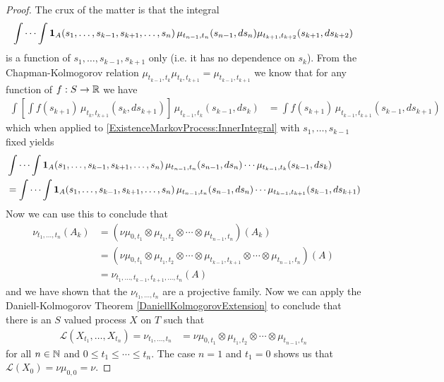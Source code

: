 \begin{proof}
The crux of the matter is that the integral
\begin{align}\label{ExistenceMarkovProcess:InnerIntegral}
\idotsint \textbf{1}_{A}(s_1, \dotsc, s_{k-1}, s_{k+1}, \dotsc, s_n) \, 
\mu_{t_{n-1},t_n}(s_{n-1}, ds_n) \mu_{t_{k+1}, t_{k+2}}(s_{k+1}, ds_{k+2}) 
\end{align}
is a function of $s_1, \dotsc, s_{k-1}, s_{k+1}$ only (i.e. it has no dependence on $s_k$).  From the Chapman-Kolmogorov relation
$\mu_{t_{k-1}, t_k} \mu_{t_{k}, t_{k+1}}  = \mu_{t_{k-1}, t_{k+1}}$ we
know that for any function of $f : S \to \mathbb{R}$ we have 
\begin{align*}
\int \left [
  \int
f(s_{k+1}) \, \mu_{t_{k}, t_{k+1}} (s_k, ds_{k+1}) \right ] \, \mu_{t_{k-1}, t_k}
(s_{k-1}, ds_{k}) &= \int
f(s_{k+1}) \, \mu_{t_{k-1}, t_{k+1}} (s_{k-1}, ds_{k+1}) 
\end{align*}
which when applied to \eqref{ExistenceMarkovProcess:InnerIntegral} with $s_1, \dotsc, s_{k-1}$ fixed yields
\begin{align*}
&\idotsint \textbf{1}_{A}(s_1,\dotsc, s_{k-1}, s_{k+1}, \dotsc, s_n) \,
\mu_{t_{n-1},t_n}(s_{n-1}, ds_n) \dotsb \mu_{t_{k-1},t_{k}}(s_{k-1}, ds_{k}) \\
&=\idotsint \textbf{1}_{A}(s_1,\dotsc, s_{k-1}, s_{k+1}, \dotsc, s_n) \,
\mu_{t_{n-1},t_n}(s_{n-1}, ds_n) \dotsb \mu_{t_{k-1}, t_{k+1}}(s_{k-1}, ds_{k+1})
\end{align*}
Now we can use this to conclude that 
\begin{align*}
\nu_{t_1, \dotsc, t_n}(A_k) &= ( \nu \mu_{0,t_1} \otimes \mu_{t_1, t_2}
\otimes \dotsb \otimes \mu_{t_{n-1}, t_n})(A_k) \\
&= ( \nu \mu_{0,t_1} \otimes \mu_{t_1, t_2} \otimes \dotsb \otimes
\mu_{t_{k-1}, t_{k+1}} \otimes \dotsb \otimes \mu_{t_{n-1}, t_n})(A)
\\
&=\nu_{t_1, \dotsc, t_{k-1}, t_{k+1}, \dotsc, t_n}(A)
 \end{align*}
and we have shown that the $\nu_{t_1, \dotsc, t_n}$ are a projective
family.
Now we can apply the Daniell-Kolmogorov Theorem
\ref{DaniellKolmogorovExtension} to conclude that there is an $S$
valued process $X$ on $T$ such that 
\begin{align*}
\mathcal{L}(X_{t_1}, \dotsc, X_{t_n}) = \nu_{t_1, \dotsc, t_n} &= \nu \mu_{0,t_1} \otimes \mu_{t_1, t_2}
\otimes \dotsb \otimes \mu_{t_{n-1}, t_n}
\end{align*}
for all $n \in \mathbb{N}$ and $0 \leq t_1 \leq \dotsb \leq t_n$.  The
case $n=1$ and $t_1 = 0$ shows us that $\mathcal{L}(X_0) = \nu
\mu_{0,0} = \nu$.


\end{proof}
